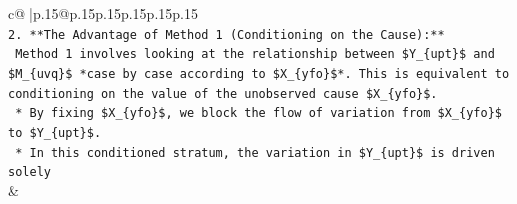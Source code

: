 \documentclass{article}
\begin{document}
{\begin{supertabular}{c@{$\;$}|p{.15\linewidth}@{}p{.15\linewidth}p{.15\linewidth}p{.15\linewidth}p{.15\linewidth}p{.15\linewidth}}
{{{\\ 
\texttt{2.  **The Advantage of Method 1 (Conditioning on the Cause):**} \\
\texttt{    Method 1 involves looking at the relationship between \$Y\_\{upt\}\$ and \$M\_\{uvq\}\$ *case by case according to \$X\_\{yfo\}\$*. This is equivalent to conditioning on the value of the unobserved cause \$X\_\{yfo\}\$.} \\
\texttt{    *   By fixing \$X\_\{yfo\}\$, we block the flow of variation from \$X\_\{yfo\}\$ to \$Y\_\{upt\}\$.} \\
\texttt{    *   In this conditioned stratum, the variation in \$Y\_\{upt\}\$ is driven solely} \\
            }
        }
    }
    & \\ \\


\end{supertabular}}
\end{document}
